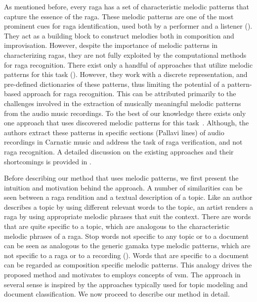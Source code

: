 As mentioned before, every \gls{raga} has a set of characteristic melodic patterns that capture the essence of the \gls{raga}. These melodic patterns are one of the most prominent cues for \gls{raga} identification, used both by a performer and a listener (). They act as a building block to construct melodies both in composition and improvisation. However, despite the importance of melodic patterns in characterizing \glspl{raga}, they are not fully exploited by the computational methods for \gls{raga} recognition.  There exist only a handful of approaches that utilize melodic patterns for this task (). However, they work with a discrete representation, and pre-defined dictionaries of these patterns, thus limiting the potential of a pattern-based approach for \gls{raga} recognition. This can be attributed primarily to the challenges involved in the extraction of musically meaningful melodic patterns from the audio music recordings. To the best of our knowledge there exists only one approach that uses discovered melodic patterns for this task~\citep{shrey_ISMIR_2015}. Although, the authors extract these patterns in specific sections (Pallavi lines) of audio recordings in Carnatic music and address the task of \gls{raga} verification, and not \gls{raga} recognition. A detailed discussion on the existing approaches and their shortcomings is provided in .

Before describing our method that uses melodic patterns, we first present the intuition and motivation behind the approach. A number of similarities can be seen between a \gls{raga} rendition and a textual description of a topic. Like an author describes a topic by using different relevant words to the topic, an artist renders a \gls{raga} by using appropriate melodic phrases that suit the context. There are words that are quite specific to a topic, which are analogous to the characteristic melodic phrases of a \gls{raga}. Stop words not specific to any topic or to a document can be seen as analogous to the generic \gls{gamaka} type melodic patterns, which are not specific to a \gls{raga} or to a recording (). Words that are specific to a document can be regarded as composition specific melodic patterns. This analogy drives the proposed method and motivates to employs concepts of \gls{vsm}. The approach in several sense is inspired by the approaches typically used for topic modeling and document classification. We now proceed to describe our method in detail.

